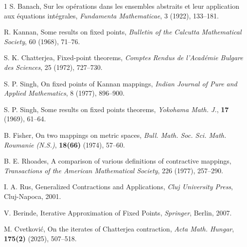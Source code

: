 \documentclass[12pt]{article}
\begin{document}
\begin{thebibliography}{1}
S. Banach, 
\newblock Sur les opérations dans les ensembles abstraits et leur application aux équations intégrales, 
\newblock \textit{Fundamenta Mathematicae}, 3 (1922), 133--181.

R. Kannan, 
\newblock Some results on fixed points, 
\newblock \textit{Bulletin of the Calcutta Mathematical Society}, 60 (1968), 71--76.

S. K. Chatterjea, 
\newblock Fixed-point theorems, 
\newblock \textit{Comptes Rendus de l’Académie Bulgare des Sciences}, 25 (1972), 727--730.

S. P. Singh, 
\newblock On fixed points of Kannan mappings, 
\newblock \textit{Indian Journal of Pure and Applied Mathematics}, 8 (1977), 896--900.

 S. P. Singh, Some results on fixed points theorems, \emph{Yokohama Math. J.}, \textbf{17} (1969), 61--64.

 B. Fisher, On two mappings on metric spaces, \emph{Bull. Math. Soc. Sci. Math. Roumanie (N.S.)}, \textbf{18(66)} (1974), 57--60.

B. E. Rhoades, 
\newblock A comparison of various definitions of contractive mappings, 
\newblock \textit{Transactions of the American Mathematical Society}, 226 (1977), 257--290.

I. A. Rus, 
\newblock Generalized Contractions and Applications, 
\newblock \textit{Cluj University Press}, Cluj-Napoca, 2001.

V. Berinde, 
\newblock Iterative Approximation of Fixed Points, 
\newblock \textit{Springer}, Berlin, 2007.

 M. Cvetković, On the iterates of Chatterjea contraction, \emph{Acta Math. Hungar}, \textbf{175(2)} (2025), 507--518.
\end{thebibliography}

\end{document}
